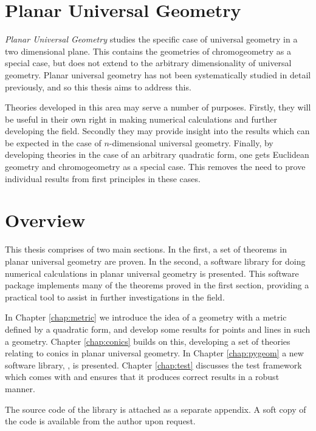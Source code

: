 \section{Planar Universal Geometry}

\emph{Planar Universal Geometry} studies the specific case of universal geometry in a two dimensional plane.
This contains the geometries of chromogeometry as a special case, but does not extend to the arbitrary dimensionality of universal geometry.
Planar universal geometry has not been systematically studied in detail previously, and so this thesis aims to address this.

Theories developed in this area may serve a number of purposes.
Firstly, they will be useful in their own right in making numerical calculations and further developing the field.
Secondly they may provide insight into the results which can be expected in the case of $n$-dimensional universal geometry.
Finally, by developing theories in the case of an arbitrary quadratic form, one gets Euclidean geometry and chromogeometry as a special case.
This removes the need to prove individual results from first principles in these cases.


\section{Overview}

This thesis comprises of two main sections. In the first, a set of theorems in planar universal geometry are proven.
In the second, a software library for doing numerical calculations in planar universal geometry is presented.
This software package implements many of the theorems proved in the first section, providing a practical tool to assist in further investigations in the field.

In Chapter \ref{chap:metric} we introduce the idea of a geometry with a metric defined by a quadratic form, and develop some results for points and lines in such a geometry.
Chapter \ref{chap:conics} builds on this, developing a set of theories relating to conics in planar universal geometry.
In Chapter \ref{chap:pygeom} a new software library, \pygeom\!\!, is presented.
Chapter \ref{chap:test} discusses the test framework which comes with \pygeom and ensures that it produces correct results in a robust manner.

The source code of the \pygeom library is attached as a separate appendix.
A soft copy of the code is available from the author upon request.

